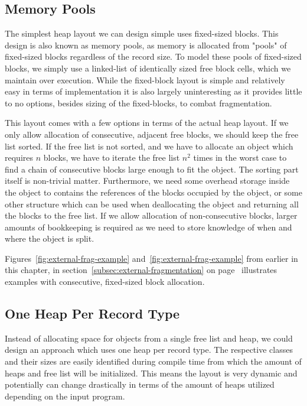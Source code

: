 \subsection{Memory Pools}
\label{subsec:memory-pools}
The simplest heap layout we can design simple uses fixed-sized blocks. This design is also known as memory pools, as memory is allocated from "pools" of fixed-sized blocks regardless of the record size.
To model these pools of fixed-sized blocks, we simply use a linked-list of identically sized free block cells, which we maintain over execution.
While the fixed-block layout is simple and relatively easy in terms of implementation it is also largely uninteresting as it provides little to no options, besides sizing of the fixed-blocks, to combat fragmentation.

This layout comes with a few options in terms of the actual heap layout. If we only allow allocation of consecutive, adjacent free blocks, we should keep the free list sorted. If the free list is not sorted, and we have to allocate an object which requires $n$ blocks, we have to iterate the free list $n^2$ times in the worst case to find a chain of consecutive blocks large enough to fit the object. The sorting part itself is non-trivial matter. Furthermore, we need some overhead storage inside the object to contains the references of the blocks occupied by the object, or some other structure which can be used when deallocating the object and returning all the blocks to the free list. If we allow allocation of non-consecutive blocks, larger amounts of bookkeeping is required as we need to store knowledge of when and where the object is split.

Figures~\ref{fig:external-frag-example} and~\ref{fig:external-frag-example} from earlier in this chapter, in section~\ref{subsec:external-fragmentation} on page~\pageref{fig:external-frag-example} illustrates examples with consecutive, fixed-sized block allocation. 


\subsection{One Heap Per Record Type}
\label{subsec:one-heap-per-record-type}
Instead of allocating space for objects from a single free list and heap, we could design an approach which uses one heap per record type. The respective classes and their sizes are easily identified during compile time from which the amount of heaps and free list will be initialized. This means the layout is very dynamic and potentially can change drastically in terms of the amount of heaps utilized depending on the input program. 


